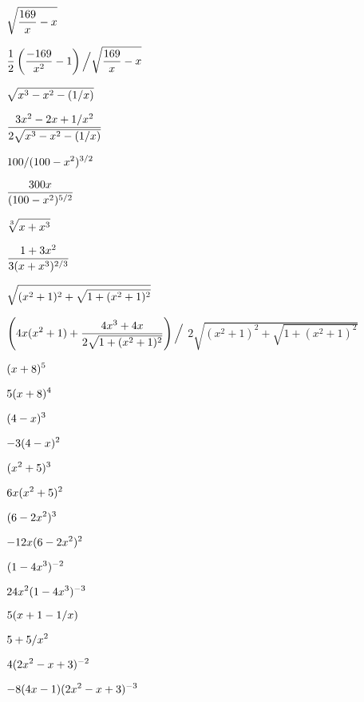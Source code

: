 \begin{exercises}
\exercise $\displaystyle\sqrt{{169\over x}-x}$
\begin{answer} $\displaystyle{1\over2}\left({-169\over x^2}-1\right)\Big/\sqrt{{169\over x}-x}$
\end{answer}

\exercise $\displaystyle \sqrt{x^3-x^2-(1/x)}$
\begin{answer} $ \displaystyle{3x^2-2x+1/x^2\over 2\sqrt{x^3-x^2-(1/x)}}$
\end{answer}

\exercise $\displaystyle 100/(100-x^2)^{3/2}$
\begin{answer} $ \displaystyle{300 x \over(100-x^2)^{5/2}}$
\end{answer}

\exercise $\ds {\root 3 \of{x+x^3}}$
\begin{answer} $ \displaystyle{ 1 + 3 x^2\over3(x+x^3)^{2/3}}$
\end{answer}

\exercise $\displaystyle \sqrt{(x^2+1)^2+\sqrt{1+(x^2+1)^2}}$
\begin{answer} $ \displaystyle \left(4x(x^2+1)+{4x^3+4x\over2\sqrt{1+(x^2+1)^2}}\right)\Big/$
\hfill\break$2\sqrt{(x^2+1)^2+\sqrt{1+(x^2+1)^2}}$
\end{answer}

\exercise $\displaystyle (x+8)^5$
\begin{answer} $\displaystyle 5(x+8)^4$
\end{answer}

\exercise $\displaystyle (4-x)^3$
\begin{answer} $\displaystyle -3(4-x)^2$
\end{answer}

\exercise $\displaystyle (x^2+5)^3$
\begin{answer} $\displaystyle 6x(x^2+5)^2$
\end{answer}

\exercise $\displaystyle (6-2x^2)^3$
\begin{answer} $\displaystyle -12x(6-2x^2)^2$
\end{answer}

\exercise $\displaystyle (1-4x^3)^{-2}$
\begin{answer} $\displaystyle 24x^2(1-4x^3)^{-3}$
\end{answer}

\exercise $\displaystyle 5(x+1-1/x)$
\begin{answer} $\displaystyle 5+5/x^2$
\end{answer}

\exercise $\displaystyle 4(2x^2-x+3)^{-2}$
\begin{answer} $\displaystyle -8(4x-1)(2x^2-x+3)^{-3}$
\end{answer}


\end{exercises}
